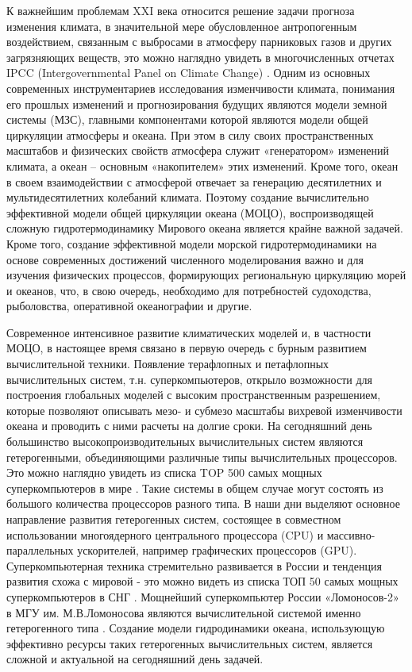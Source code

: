 
{\actuality}

К важнейшим проблемам XXI века относится решение задачи прогноза изменения климата, в значительной мере обусловленное антропогенным воздействием,
связанным с выбросами в атмосферу парниковых газов и других загрязняющих веществ, это можно наглядно увидеть в многочисленных отчетах
IPCC (Intergovernmental Panel on Climate Change) .
Одним из основных современных инструментариев исследования изменчивости климата, понимания его прошлых изменений и прогнозирования будущих являются модели земной системы (МЗС),
главными компонентами которой являются модели общей циркуляции атмосферы и океана.
При этом в силу своих пространственных масштабов и физических свойств атмосфера служит «генератором» изменений климата,
а океан – основным «накопителем» этих изменений. Кроме того, океан в своем взаимодействии с атмосферой отвечает за генерацию десятилетних
и мультидесятилетних колебаний климата.
Поэтому создание вычислительно эффективной модели общей циркуляции океана (МОЦО), воспроизводящей сложную гидротермодинамику
Мирового океана является крайне важной задачей. Кроме того, создание эффективной модели морской гидротермодинамики на основе современных достижений
численного моделирования важно и для изучения физических процессов, формирующих региональную циркуляцию морей и океанов, что,
в свою очередь, необходимо для потребностей судоходства, рыболовства, оперативной океанографии и другие.

Современное интенсивное развитие климатических моделей и, в частности МОЦО, в настоящее время связано в первую очередь с бурным развитием вычислительной техники.
Появление терафлопных и петафлопных вычислительных систем, т.н. суперкомпьютеров, открыло возможности для построения глобальных моделей с
высоким пространственным разрешением, которые позволяют описывать мезо- и субмезо масштабы вихревой изменчивости океана и проводить с ними расчеты на долгие сроки.
На сегодняшний день большинство высокопроизводительных вычислительных систем являются гетерогенными, объединяющими различные типы вычислительных процессоров.
Это можно наглядно увидеть из списка TOP 500 самых мощных суперкомпьютеров в мире .
Такие системы в общем случае могут состоять из большого количества процессоров разного типа.
В наши дни выделяют основное направление развития гетерогенных систем, состоящее в совместном использовании многоядерного центрального процессора (CPU)
и массивно-параллельных ускорителей, например графических процессоров (GPU).
Суперкомпьютерная техника стремительно развивается в России и тенденция развития схожа с мировой - это можно видеть из списка ТОП 50
самых мощных суперкомпьютеров в СНГ .
Мощнейший суперкомпьютер России «Ломоносов-2» в МГУ им. М.В.Ломоносова являются вычислительной системой именно гетерогенного типа .
Создание модели гидродинамики океана, использующую эффективно ресурсы таких гетерогенных вычислительных систем,
является сложной и актуальной на сегодняшний день задачей.

